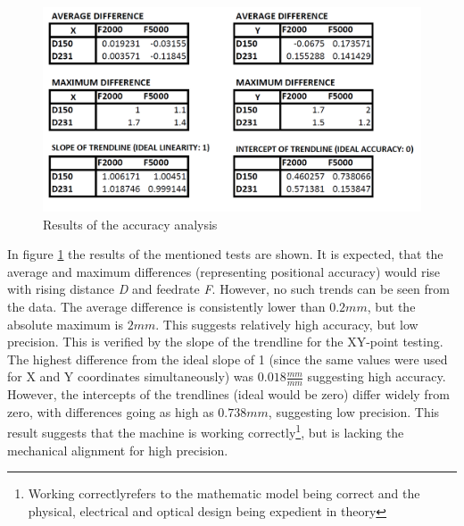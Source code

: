 \documentclass[a4paper, 11pt]{scrartcl}
\begin{document}
\begin{figure}[H]
\begin{center}
\includegraphics[width=15cm]{img/accuracy.png}
\caption{Results of the accuracy analysis}
\label{results}
\end{center}
\end{figure}
In figure \ref{results} the results of the mentioned tests are shown. It is expected, that the average and maximum differences (representing positional accuracy) would rise with rising distance \textit{D} and feedrate \textit{F}. However, no such trends can be seen from the data. The average difference is consistently lower than $0.2mm$, but the absolute maximum is $2mm$. This suggests relatively high accuracy, but low precision. This is verified by the slope of the trendline for the XY-point testing. The highest difference from the ideal slope of 1 (since the same values were used for X and Y coordinates simultaneously) was $0.018\frac{mm}{mm}$ suggesting high accuracy. However, the intercepts of the trendlines (ideal would be zero) differ widely from zero, with differences going as high as $0.738mm$, suggesting low precision. This result suggests that the machine is working correctly\footnote{\glqq Working correctly\grqq refers to the mathematic model being correct and the physical, electrical and optical design being expedient in theory}, but is lacking the mechanical alignment for high precision.\\ 
\end{document}
